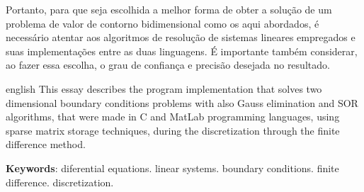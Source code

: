 \documentclass[
	article,			%
	11pt,				%
	oneside,			%
	a4paper,			%
	english,			%
	brazil,				%
	sumario=tradicional
	]{abntex2}
\begin{document}
Portanto, para que seja escolhida a melhor forma de obter a solução de um problema de valor de contorno bidimensional como os aqui abordados, é necessário atentar aos algoritmos de resolução de sistemas lineares empregados e suas implementações entre as duas linguagens. É importante também considerar, ao fazer essa escolha, o grau de confiança e precisão desejada no resultado.

\postextual



\emptythanks
\maketitle

\renewcommand{\resumoname}{Abstract}
\begin{resumoumacoluna}
 \begin{otherlanguage*}{english}
   This essay describes the program implementation that solves two dimensional boundary conditions problems with also Gauss elimination and SOR algorithms, that were made in C and MatLab programming languages, using sparse matrix storage techniques, during the discretization through the finite difference method.

   \vspace{\onelineskip}
 
   \noindent
   \textbf{Keywords}: diferential equations. linear systems. boundary conditions. finite difference. discretization.
 \end{otherlanguage*}  
\end{resumoumacoluna}




%
%




\end{document}
